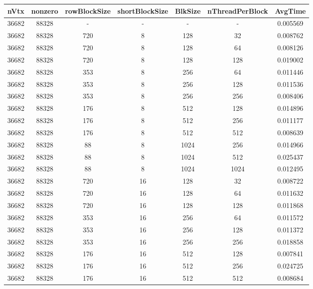 \documentclass[9pt]{article}
\begin{document}
\SetBgPosition{0.25cm,-5.0cm}
\begin{tabular}{|c|c|c|c|c|c|c| }  
\hline
nVtx  & nonzero  & rowBlockSize  & shortBlockSize  & BlkSize  & nThreadPerBlock  & AvgTime \\
\hline
36682  & 88328  &  -  & -  & -  & -  &0.005569 \\
\hline
36682  & 88328  & 720  & 8  & 128  & 32  & 0.008762 \\
\hline
36682  & 88328  & 720  & 8  & 128  & 64  & 0.008126 \\
\hline
36682  & 88328  & 720  & 8  & 128  & 128  & 0.019002 \\
\hline
36682  & 88328  & 353  & 8  & 256  & 64  & 0.011446 \\
\hline
36682  & 88328  & 353  & 8  & 256  & 128  & 0.011536 \\
\hline
36682  & 88328  & 353  & 8  & 256  & 256  & 0.008406 \\
\hline
36682  & 88328  & 176  & 8  & 512  & 128  & 0.014896 \\
\hline
36682  & 88328  & 176  & 8  & 512  & 256  & 0.011177 \\
\hline
36682  & 88328  & 176  & 8  & 512  & 512  & 0.008639 \\
\hline
36682  & 88328  & 88  & 8  & 1024  & 256  & 0.014966 \\
\hline
36682  & 88328  & 88  & 8  & 1024  & 512  & 0.025437 \\
\hline
36682  & 88328  & 88  & 8  & 1024  & 1024  & 0.012495 \\
\hline
36682  & 88328  & 720  & 16  & 128  & 32  & 0.008722 \\
\hline
36682  & 88328  & 720  & 16  & 128  & 64  & 0.011632 \\
\hline
36682  & 88328  & 720  & 16  & 128  & 128  & 0.011868 \\
\hline
36682  & 88328  & 353  & 16  & 256  & 64  & 0.011572 \\
\hline
36682  & 88328  & 353  & 16  & 256  & 128  & 0.011372 \\
\hline
36682  & 88328  & 353  & 16  & 256  & 256  & 0.018858 \\
\hline
36682  & 88328  & 176  & 16  & 512  & 128  & 0.007841 \\
\hline
36682  & 88328  & 176  & 16  & 512  & 256  & 0.024725 \\
\hline
36682  & 88328  & 176  & 16  & 512  & 512  & 0.008684 \\

\end{tabular}
\end{document}
